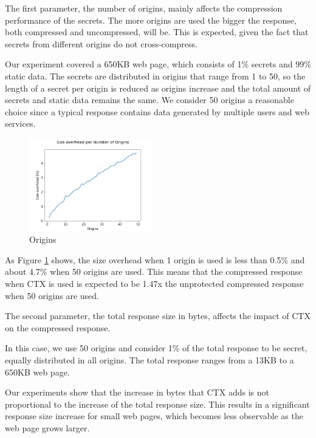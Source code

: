 The first parameter, the number of origins, mainly affects the compression
performance of the secrets. The more origins are used the bigger the response,
both compressed and uncompressed, will be. This is expected, given the fact that
secrets from different origins do not cross-compress.

Our experiment covered a 650KB web page, which consists of 1\% secrets and 99\%
static data. The secrets are distributed in origins that range from 1 to 50, so
the length of a secret per origin is reduced as origins increase and the total
amount of secrets and static data remains the same. We consider 50 origins a
reasonable choice since a typical response contains data generated by multiple
users and web services.

    \begin{figure}[thpb]
        \centering
            \includegraphics[width=0.48\textwidth]{experiments/ctx_performance/origins.png}
        \caption{Origins}
        \label{fig:origin_ctx}
    \end{figure}

As Figure \ref{fig:origin_ctx} shows, the size overhead when 1 origin is used is less than 0.5\%
and about 4.7\% when 50 origins are used. This means that the compressed
response when CTX is used is expected to be 1.47x the unprotected compressed
response when 50 origins are used.

The second parameter, the total response size in bytes, affects the impact of
CTX on the compressed response.

In this case, we use 50 origins and consider 1\% of the total response to be
secret, equally distributed in all origins. The total response ranges from a
13KB to a 650KB web page.

Our experiments show that the increase in bytes that CTX adds is not
proportional to the increase of the total response size. This results in a
significant response size increase for small web pages, which becomes less
observable as the web page grows larger.

